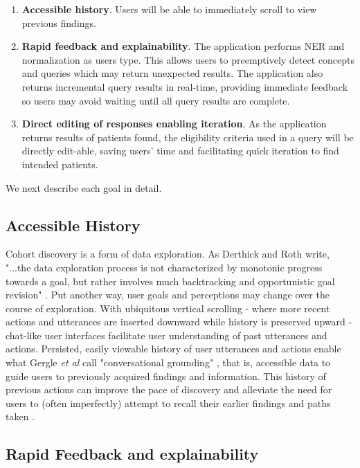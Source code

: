 \documentclass[../main.tex]{subfiles}
\begin{document}
\begin{enumerate}
    \item \textbf{Accessible history}. Users will be able to immediately scroll to view previous findings.
    \item \textbf{Rapid feedback and explainability}. The application performs NER and normalization as users type. This allows users to preemptively detect concepts and queries which may return unexpected results. The application also returns incremental query results in real-time, providing immediate feedback so users may avoid waiting until all query results are complete.
    \item \textbf{Direct editing of responses enabling iteration}. As the application returns results of patients found, the eligibility criteria used in a query will be directly edit-able, saving users' time and facilitating quick iteration to find intended patients.
\end{enumerate}

\noindent We next describe each goal in detail.

\subsection{Accessible History} 

Cohort discovery is a form of data exploration. As Derthick and Roth write, "...the data exploration process is not characterized by monotonic progress towards a goal, but rather involves much backtracking and opportunistic goal revision" \cite{derthick2001enhancing}. Put another way, user goals and perceptions may change over the course of exploration. With ubiquitous vertical scrolling - where more recent actions and utterances are inserted downward while history is preserved upward - chat-like user interfaces facilitate user understanding of past utterances and actions. Persisted, easily viewable history of user utterances and actions enable what Gergle \textit{et al} call "conversational grounding" \cite{gergle2004persistence}, that is, accessible data to guide users to previously acquired findings and information. This history of previous actions can improve the pace of discovery and alleviate the need for users to (often imperfectly) attempt to recall their earlier findings and paths taken \cite{hill1994history, gergle2004persistence}.

\subsection{Rapid Feedback and explainability}
\end{document}
